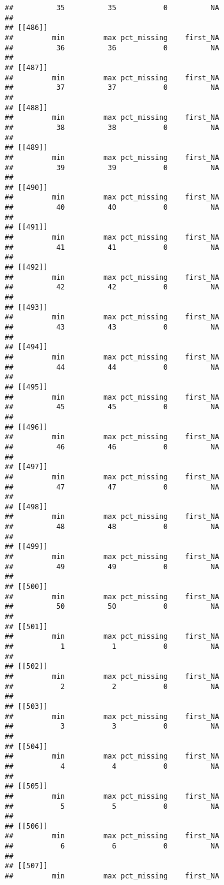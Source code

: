 \documentclass[
]{article}
\begin{document}
\begin{verbatim}
##          35          35           0          NA 
## 
## [[486]]
##         min         max pct_missing    first_NA 
##          36          36           0          NA 
## 
## [[487]]
##         min         max pct_missing    first_NA 
##          37          37           0          NA 
## 
## [[488]]
##         min         max pct_missing    first_NA 
##          38          38           0          NA 
## 
## [[489]]
##         min         max pct_missing    first_NA 
##          39          39           0          NA 
## 
## [[490]]
##         min         max pct_missing    first_NA 
##          40          40           0          NA 
## 
## [[491]]
##         min         max pct_missing    first_NA 
##          41          41           0          NA 
## 
## [[492]]
##         min         max pct_missing    first_NA 
##          42          42           0          NA 
## 
## [[493]]
##         min         max pct_missing    first_NA 
##          43          43           0          NA 
## 
## [[494]]
##         min         max pct_missing    first_NA 
##          44          44           0          NA 
## 
## [[495]]
##         min         max pct_missing    first_NA 
##          45          45           0          NA 
## 
## [[496]]
##         min         max pct_missing    first_NA 
##          46          46           0          NA 
## 
## [[497]]
##         min         max pct_missing    first_NA 
##          47          47           0          NA 
## 
## [[498]]
##         min         max pct_missing    first_NA 
##          48          48           0          NA 
## 
## [[499]]
##         min         max pct_missing    first_NA 
##          49          49           0          NA 
## 
## [[500]]
##         min         max pct_missing    first_NA 
##          50          50           0          NA 
## 
## [[501]]
##         min         max pct_missing    first_NA 
##           1           1           0          NA 
## 
## [[502]]
##         min         max pct_missing    first_NA 
##           2           2           0          NA 
## 
## [[503]]
##         min         max pct_missing    first_NA 
##           3           3           0          NA 
## 
## [[504]]
##         min         max pct_missing    first_NA 
##           4           4           0          NA 
## 
## [[505]]
##         min         max pct_missing    first_NA 
##           5           5           0          NA 
## 
## [[506]]
##         min         max pct_missing    first_NA 
##           6           6           0          NA 
## 
## [[507]]
##         min         max pct_missing    first_NA 

\end{verbatim}
\end{document}
